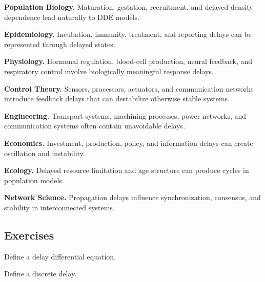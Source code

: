 \begin{applicationbox}

\textbf{Population Biology.}
Maturation, gestation, recruitment, and delayed density dependence lead
naturally to DDE models.

\medskip

\textbf{Epidemiology.}
Incubation, immunity, treatment, and reporting delays can be represented
through delayed states.

\medskip

\textbf{Physiology.}
Hormonal regulation, blood-cell production, neural feedback, and
respiratory control involve biologically meaningful response delays.

\medskip

\textbf{Control Theory.}
Sensors, processors, actuators, and communication networks introduce
feedback delays that can destabilize otherwise stable systems.

\medskip

\textbf{Engineering.}
Transport systems, machining processes, power networks, and
communication systems often contain unavoidable delays.

\medskip

\textbf{Economics.}
Investment, production, policy, and information delays can create
oscillation and instability.

\medskip

\textbf{Ecology.}
Delayed resource limitation and age structure can produce cycles in
population models.

\medskip

\textbf{Network Science.}
Propagation delays influence synchronization, consensus, and stability in
interconnected systems.

\end{applicationbox}

\subsection{Exercises}
\label{subsec:dde-exercises}

\begin{exercise}[1]
Define a delay differential equation.
\end{exercise}

\begin{exercise}[1]
Define a discrete delay.
\end{exercise}

